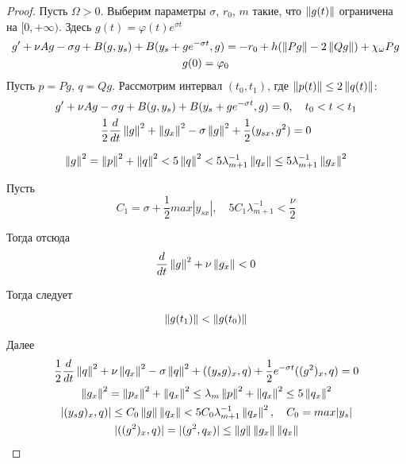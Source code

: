 \begin{proof}
    Пусть $\Omega > 0$. Выберим параметры $\sigma$, $r_0$, $m$ такие, что
    $\left\lVert g(t)\right\rVert$ ограничена на $[0, +\infty)$. Здесь $g(t) = \varphi(t)e^{\sigma t}$
    \begin{gather*}
        g' + \nu Ag - \sigma g + B(g, y_s) + B(y_s + ge^{-\sigma t}, g) = -r_0 +
        h(\left\lVert Pg\right\rVert - 2 \left\lVert Qg\right\rVert) + \chi_{\omega}Pg\\*
        g(0) = \varphi_0
    \end{gather*}
    Пусть $p = Pg$, $q = Qg$. Рассмотрим интервал $(t_0, t_1)$, где $\left\lVert p(t)\right\rVert
    \le 2 \left\lVert q(t)\right\rVert$:
    \begin{gather*}
        g' + \nu Ag - \sigma g + B(g, y_s) + B(y_s + ge^{-\sigma t}, g) = 0, \quad
        t_0 < t < t_1\\
        \frac{1}{2}\frac{d}{dt}\left\lVert g\right\rVert^2 + \left\lVert g_x\right\rVert^2 - \sigma \left\lVert g\right\rVert^2 +
        \frac{1}{2}(y_{sx}, g^2) = 0
    \end{gather*}

    \begin{gather*}
        \left\lVert g\right\rVert^2 = \left\lVert p\right\rVert^2 + \left\lVert q\right\rVert^2 < 5\left\lVert q\right\rVert^2 < 5\lambda^{-1}_{m +
        1}\left\lVert q_x\right\rVert \le 5 \lambda^{-1}_{m + 1}\left\lVert g_x\right\rVert^2
    \end{gather*}

    Пусть 
    \begin{equation}
        C_1 = \sigma + \frac{1}{2}max|y_{sx}|, \quad 5C_1\lambda^{-1}_{m + 1} <
        \frac{\nu}{2}
    \end{equation}

    Тогда отсюда 
    \begin{equation}
        \frac{d}{dt}\left\lVert g\right\rVert^2 + \nu \left\lVert g_x\right\rVert < 0
    \end{equation}

    Тогда следует

    \begin{equation}
        \left\lVert g(t_1)\right\rVert < \left\lVert g(t_0)\right\rVert
    \end{equation}

    Далее 
    \begin{gather*}
        \frac{1}{2}\frac{d}{dt}\left\lVert q\right\rVert^2 + \nu \left\lVert q_x\right\rVert^2 - \sigma \left\lVert q\right\rVert^2 +
        ((y_s g)_x, q) + \frac{1}{2}e^{-\sigma t}((g^2)_x, q) = 0\\
        \left\lVert g_x\right\rVert^2 = \left\lVert p_x\right\rVert^2 + \left\lVert q_x\right\rVert^2 \le \lambda_{m} \left\lVert p\right\rVert^2 +
        \left\lVert q_x\right\rVert^2 \le 5\left\lVert q_x\right\rVert^2\\
        |(y_s g)_x, q)| \le C_0 \left\lVert g\right\rVert \left\lVert q_x\right\rVert < 5 C_0 \lambda^{-1}_{m + 1}
        \left\lVert q_x\right\rVert^2, \quad C_0 = max|y_s|\\
        |((g^2)_x, q)| = |(g^2, q_x)| \le \left\lVert g\right\rVert \left\lVert g_x\right\rVert \left\lVert q_x\right\rVert
    \end{gather*}
    

\end{proof}
